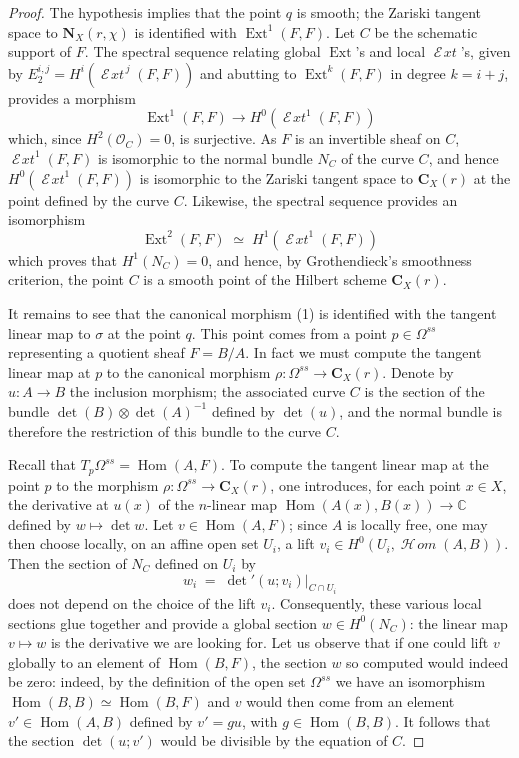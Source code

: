 \documentclass[12pt,english]{smfart}%
\theoremstyle{plain}
\theoremstyle{definition}
\theoremstyle{remark}
\newcommand{\CC}{\mathbb{C}}
\newcommand{\Oh}{\mathcal{O}}
\DeclareMathOperator{\Hom}{Hom}
\DeclareMathOperator{\Ext}{Ext}
\newcommand{\Homsh}{\mathop{\mathcal{H}\!\mathit{om}}\nolimits}
\newcommand{\Extsh}{\mathop{\mathcal{E}\!\mathit{xt}}\nolimits}
\newcommand{\origpage}[1]{\marginnote{\scriptsize\itshape p.~#1}}
\begin{document}
\begin{proof}
The hypothesis implies that the point $q$ is smooth; the Zariski tangent space to $\mathbf{N}_{X}(r,\chi)$ is identified with $\Ext^{1}(F,F)$. Let $C$ be the schematic support of $F$. The spectral sequence relating global $\Ext$'s and local $\Extsh$'s, given by $E_{2}^{i,j}=H^{i}(\Extsh^{\,j}(F,F))$ and abutting to $\Ext^{k}(F,F)$ in degree $k=i+j$, provides a morphism
\begin{equation}
\Ext^{1}(F,F) \longrightarrow H^{0}(\Extsh^{1}(F,F))
\end{equation}
which, since $H^{2}(\Oh_{C})=0$, is surjective. As $F$ is an invertible sheaf on $C$, $\Extsh^{1}(F,F)$ is isomorphic to the normal bundle $N_{C}$ of the curve $C$, and hence $H^{0}(\Extsh^{1}(F,F))$ is isomorphic to the Zariski tangent space to $\mathbf{C}_{X}(r)$ at the point defined by the curve $C$. Likewise, the spectral sequence provides an isomorphism
\[
\Ext^{2}(F,F) \;\simeq\; H^{1}(\Extsh^{1}(F,F))
\]
\origpage{641}%
which proves that $H^{1}(N_{C})=0$, and hence, by Grothendieck's smoothness criterion, the point $C$ is a smooth point of the Hilbert scheme $\mathbf{C}_{X}(r)$.

It remains to see that the canonical morphism (1) is identified with the tangent linear map to $\sigma$ at the point $q$. This point comes from a point $p\in\Omega^{ss}$ representing a quotient sheaf $F=B/A$. In fact we must compute the tangent linear map at $p$ to the canonical morphism $\rho:\Omega^{ss}\to\mathbf{C}_{X}(r)$. Denote by $u:A\to B$ the inclusion morphism; the associated curve $C$ is the section of the bundle $\det(B)\otimes\det(A)^{-1}$ defined by $\det(u)$, and the normal bundle is therefore the restriction of this bundle to the curve $C$.

Recall that $T_{p}\Omega^{ss}=\Hom(A,F)$. To compute the tangent linear map at the point $p$ to the morphism $\rho:\Omega^{ss}\to\mathbf{C}_{X}(r)$, one introduces, for each point $x\in X$, the derivative at $u(x)$ of the $n$-linear map $\Hom(A(x),B(x))\to\CC$ defined by $w\mapsto \det w$. Let $v\in\Hom(A,F)$; since $A$ is locally free, one may then choose locally, on an affine open set $U_{i}$, a lift $v_{i}\in H^{0}(U_{i},\Homsh(A,B))$. Then the section of $N_{C}$ defined on $U_{i}$ by
\[
w_{i} \;=\; \det{}'(u;v_{i})\big|_{C\cap U_{i}}
\]
does not depend on the choice of the lift $v_{i}$. Consequently, these various local sections glue together and provide a global section $w\in H^{0}(N_{C})$: the linear map $v\mapsto w$ is the derivative we are looking for. Let us observe that if one could lift $v$ globally to an element of $\Hom(B,F)$, the section $w$ so computed would indeed be zero: indeed, by the definition of the open set $\Omega^{ss}$ we have an isomorphism $\Hom(B,B)\simeq\Hom(B,F)$ and $v$ would then come from an element $v'\in\Hom(A,B)$ defined by $v'=gu$, with $g\in\Hom(B,B)$. It follows that the section $\det(u;v')$ would be divisible by the equation of $C$.


\end{proof}
\end{document}
